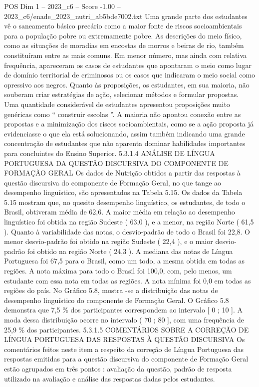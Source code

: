 \begin{textsample}{POS Dim 1 – 2023\_c6 – Score -1.00 – 2023\_c6/enade\_2023\_nutri\_ab5bde7002.txt}
Uma grande parte dos estudantes vê o saneamento básico precário como a maior fonte de riscos socioambientais para a população pobre ou extremamente pobre.
As descrições do meio físico, como as situações de moradias em encostas de morros e beiras de rio, também constituíram entre as mais comuns.
Em menor número, mas ainda com relativa frequência, apareceram os casos de estudantes que apontaram o meio como lugar de domínio territorial de criminosos ou os casos que indicaram o meio social como opressivo aos negros.
Quanto às proposições, os estudantes, em sua maioria, não souberam criar estratégias de ação, selecionar métodos e formular propostas.
Uma quantidade considerável de estudantes apresentou proposições muito genéricas como “ construir escolas ”.
A maioria não apontou conexão entre as propostas e a minimização dos riscos socioambientais, como se a ação proposta já evidenciasse o que ela está solucionando, assim também indicando uma grande concentração de estudantes que não aparenta dominar habilidades importantes para concluintes do Ensino Superior. 5.3.1.4 ANÁLISE DE LÍNGUA PORTUGUESA DA QUESTÃO DISCURSIVA DO COMPONENTE DE FORMAÇÃO GERAL Os dados de Nutrição obtidos a partir das respostas à questão discursiva do componente de Formação Geral, no que tange ao desempenho linguístico, são apresentados na Tabela 5.15.
Os dados da Tabela 5.15 mostram que, no quesito desempenho linguístico, os estudantes, de todo o Brasil, obtiveram média de 62,6.
A maior média em relação ao desempenho linguístico foi obtida na região Sudeste ( 63,0 ), e a menor, na região Norte ( 61,5 ).
Quanto à variabilidade das notas, o desvio-padrão de todo o Brasil foi 22,8.
O menor desvio-padrão foi obtido na região Sudeste ( 22,4 ), e o maior desvio-padrão foi obtido na região Norte ( 24,3 ).
A mediana das notas de Língua Portuguesa foi 67,5 para o Brasil, como um todo, a mesma obtida em todas as regiões.
A nota máxima para todo o Brasil foi 100,0, com, pelo menos, um estudante com essa nota em todas as regiões.
A nota mínima foi 0,0 em todas as regiões do país.
No Gráfico 5.8, mostra -se a distribuição das notas de desempenho linguístico do componente de Formação Geral.
O Gráfico 5.8 demonstra que 7,5 \% dos participantes correspondem ao intervalo [ 0 ; 10 ].
A moda dessa distribuição ocorre no intervalo ( 70 ; 80 ], com uma frequência de 25,9 \% dos participantes. 5.3.1.5 COMENTÁRIOS SOBRE A CORREÇÃO DE LÍNGUA PORTUGUESA DAS RESPOSTAS À QUESTÃO DISCURSIVA Os comentários feitos neste item a respeito da correção de Língua Portuguesa das respostas emitidas para a questão discursiva do componente de Formação Geral estão agrupados em três pontos : avaliação da questão, padrão de resposta utilizado na avaliação e análise das respostas dadas pelos estudantes.

\end{textsample}
